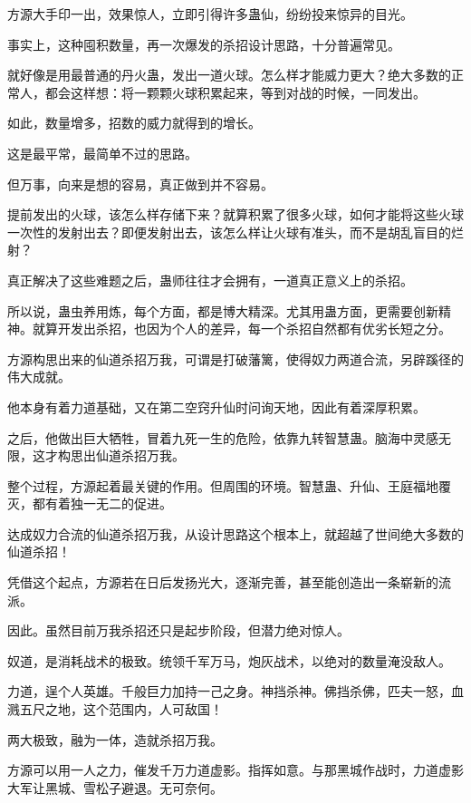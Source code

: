 
\begin{this_body}

方源大手印一出，效果惊人，立即引得许多蛊仙，纷纷投来惊异的目光。

事实上，这种囤积数量，再一次爆发的杀招设计思路，十分普遍常见。

就好像是用最普通的丹火蛊，发出一道火球。怎么样才能威力更大？绝大多数的正常人，都会这样想：将一颗颗火球积累起来，等到对战的时候，一同发出。

如此，数量增多，招数的威力就得到的增长。

这是最平常，最简单不过的思路。

但万事，向来是想的容易，真正做到并不容易。

提前发出的火球，该怎么样存储下来？就算积累了很多火球，如何才能将这些火球一次性的发射出去？即便发射出去，该怎么样让火球有准头，而不是胡乱盲目的烂射？

真正解决了这些难题之后，蛊师往往才会拥有，一道真正意义上的杀招。

所以说，蛊虫养用炼，每个方面，都是博大精深。尤其用蛊方面，更需要创新精神。就算开发出杀招，也因为个人的差异，每一个杀招自然都有优劣长短之分。

方源构思出来的仙道杀招万我，可谓是打破藩篱，使得奴力两道合流，另辟蹊径的伟大成就。

他本身有着力道基础，又在第二空窍升仙时问询天地，因此有着深厚积累。

之后，他做出巨大牺牲，冒着九死一生的危险，依靠九转智慧蛊。脑海中灵感无限，这才构思出仙道杀招万我。

整个过程，方源起着最关键的作用。但周围的环境。智慧蛊、升仙、王庭福地覆灭，都有着独一无二的促进。

达成奴力合流的仙道杀招万我，从设计思路这个根本上，就超越了世间绝大多数的仙道杀招！

凭借这个起点，方源若在日后发扬光大，逐渐完善，甚至能创造出一条崭新的流派。

因此。虽然目前万我杀招还只是起步阶段，但潜力绝对惊人。

奴道，是消耗战术的极致。统领千军万马，炮灰战术，以绝对的数量淹没敌人。

力道，逞个人英雄。千般巨力加持一己之身。神挡杀神。佛挡杀佛，匹夫一怒，血溅五尺之地，这个范围内，人可敌国！

两大极致，融为一体，造就杀招万我。

方源可以用一人之力，催发千万力道虚影。指挥如意。与那黑城作战时，力道虚影大军让黑城、雪松子避退。无可奈何。


\end{this_body}
